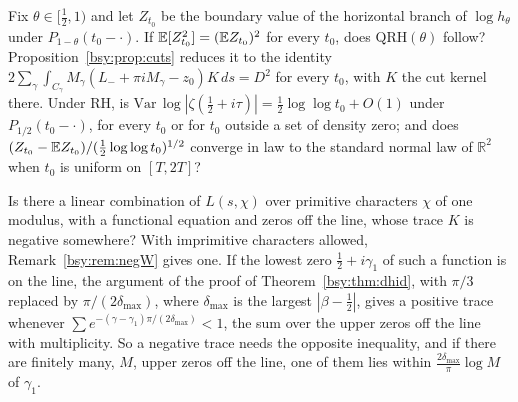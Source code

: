 \begin{problem}\label{bsy:op:cmart}
Fix $\theta\in[\frac12,1)$ and let $Z_{t_0}$ be the boundary value of the horizontal branch of $\log h_\theta$ under $P_{1-\theta}(t_0-\cdot)$. If $\mathbb{E}[Z_{t_0}^2]=(\mathbb{E} Z_{t_0})^2$ for every $t_0$, does $\mathrm{QRH}(\theta)$ follow? Proposition~\ref{bsy:prop:cuts} reduces it to the identity $2\sum_\gamma\int_{C_\gamma}M_\gamma(L_-+\pi iM_\gamma-z_0)K\,ds=D^2$ for every $t_0$, with $K$ the cut kernel there. Under RH, is $\mathrm{Var}\,\log|\zeta(\frac12+i\tau)|=\frac12\log\log t_0+O(1)$ under $P_{1/2}(t_0-\cdot)$, for every $t_0$ or for $t_0$ outside a set of density zero; and does $(Z_{t_0}-\mathbb{E} Z_{t_0})/(\frac12\log\log t_0)^{1/2}$ converge in law to the standard normal law of $\mathbb R^2$ when $t_0$ is uniform on $[T,2T]$?
\end{problem}

\begin{problem}\label{bsy:op:dh}
Is there a linear combination of $L(s,\chi)$ over primitive characters $\chi$ of one modulus, with a functional equation and zeros off the line, whose trace $K$ is negative somewhere? With imprimitive characters allowed, Remark~\ref{bsy:rem:negW} gives one. If the lowest zero $\frac12+i\gamma_1$ of such a function is on the line, the argument of the proof of Theorem~\ref{bsy:thm:dhid}, with $\pi/3$ replaced by $\pi/(2\delta_{\max})$, where $\delta_{\max}$ is the largest $|\beta-\frac12|$, gives a positive trace whenever $\sum e^{-(\gamma-\gamma_1)\pi/(2\delta_{\max})}<1$, the sum over the upper zeros off the line with multiplicity. So a negative trace needs the opposite inequality, and if there are finitely many, $M$, upper zeros off the line, one of them lies within $\frac{2\delta_{\max}}\pi\log M$ of $\gamma_1$.
\end{problem}
